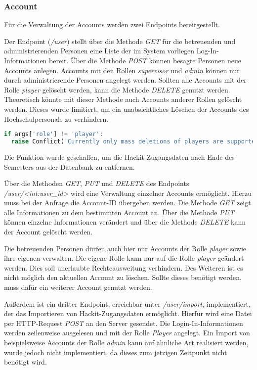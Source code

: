 \subsubsection{Account}
Für die Verwaltung der Accounts werden zwei Endpoints bereitgestellt. 

Der Endpoint (\textit{/user}) stellt über die Methode \textit{GET} für die betreuenden und administrierenden Personen eine Liste der im System vorliegen Log-In-Informationen bereit. Über die Methode \textit{POST} können besagte Personen neue Accounts anlegen. Accounts mit den Rollen \textit{supervisor} und \textit{admin} können nur durch administrierende Personen angelegt werden. Sollten alle Accounts mit der Rolle \textit{player} gelöscht werden, kann die Methode \textit{DELETE} genutzt werden. Theoretisch könnte mit dieser Methode auch Accounts anderer Rollen gelöscht werden. Dieses wurde limitiert, um ein unabsichtliches Löschen der Accounts des Hochschulpersonals zu verhindern.

\begin{lstlisting}[language=Python, frame=single, caption={GIS Löschen auf player-Accounts begrenzen}, captionpos=b, label={lst:gis-delete-all-players}]
if args['role'] != 'player':
  raise Conflict('Currently only mass deletions of players are supported.')
\end{lstlisting}

Die Funktion wurde geschaffen, um die Hackit-Zugangsdaten nach Ende des Semesters aus der Datenbank zu entfernen.

Über die Methoden \textit{GET}, \textit{PUT} und \textit{DELETE} des Endpoints \textit{/user/<int:user\_id>} wird eine Verwaltung einzelner Accounts ermöglicht. Hierzu muss bei der Anfrage die Account-ID übergeben werden. Die Methode \textit{GET} zeigt alle Informationen zu dem bestimmten Account an. Über die Methode \textit{PUT} können einzelne Informationen verändert und über die Methode \textit{DELETE} kann der Account gelöscht werden.

Die betreuenden Personen dürfen auch hier nur Accounts der Rolle \textit{player} sowie ihre eigenen verwalten. Die eigene Rolle kann nur auf die Rolle \textit{player} geändert werden. Dies soll unerlaubte Rechteausweitung verhindern. Des Weiteren ist es nicht möglich den aktuellen Account zu löschen. Sollte dieses benötigt werden, muss dafür ein weiterer Account genutzt werden.

Außerdem ist ein dritter Endpoint, erreichbar unter \textit{/user/import}, implementiert, der das Importieren von Hackit-Zugangsdaten ermöglicht. Hierfür wird eine Datei per HTTP-Request \textit{POST} an den Server gesendet. Die Login-In-Informationen werden zeilenweise ausgelesen und mit der Rolle \textit{Player} angelegt. Ein Import von beispielsweise Accounts der Rolle \textit{admin} kann auf ähnliche Art realisiert werden, wurde jedoch nicht implementiert, da dieses zum jetzigen Zeitpunkt nicht benötigt wird.

